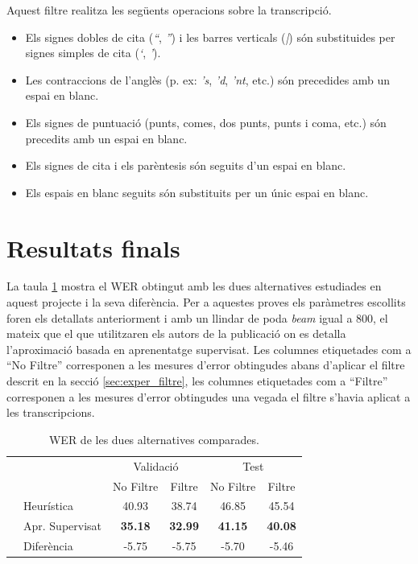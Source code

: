 Aquest filtre realitza les següents operacions sobre la transcripció.
\begin{itemize}
\item Els signes dobles de cita (\emph{``}, \emph{''}) i les barres verticals (\emph{|}) són substituides per signes simples de cita (\emph{`}, \emph{'}).
\item Les contraccions de l'anglès (p. ex: \emph{'s}, \emph{'d}, \emph{'nt}, etc.) són precedides amb un espai en blanc.
\item Els signes de puntuació (punts, comes, dos punts, punts i coma, etc.) són precedits amb un espai en blanc.
\item Els signes de cita i els parèntesis són seguits d'un espai en blanc.
\item Els espais en blanc seguits són substituits per un únic espai en blanc.
\end{itemize}

\section{Resultats finals}
La taula \ref{tab:comp_prhlt_elirf} mostra el WER obtingut amb les dues alternatives estudiades en aquest projecte i la seva diferència. Per a aquestes proves els paràmetres escollits foren els detallats anteriorment i amb un llindar de poda \emph{beam} igual a 800, el mateix que el que utilitzaren els autors de la publicació on es detalla l'aproximació basada en aprenentatge supervisat. Les columnes etiquetades com a ``No Filtre'' corresponen a les mesures d'error obtingudes abans d'aplicar el filtre descrit en la secció \ref{sec:exper_filtre}, les columnes etiquetades com a ``Filtre'' corresponen a les mesures d'error obtingudes una vegada el filtre s'havia aplicat a les transcripcions.\\

\begin{table}
\begin{center}
\begin{tabular}{ll|c|c|c|c|}
\cline{3-6} & & \multicolumn{2}{c|}{Validació} & \multicolumn{2}{c|}{Test}\\
\cline{3-6} & & No Filtre & Filtre & No Filtre & Filtre\\
\cline{1-6} \multicolumn{1}{|l}{} & Heurística & 40.93 & 38.74 & 46.85 & 45.54\\ 
\cline{1-6} \multicolumn{1}{|l}{} & Apr. Supervisat & \textbf{35.18} & \textbf{32.99} & \textbf{41.15} & \textbf{40.08}\\ 
\cline{1-6} \multicolumn{1}{|l}{} & Diferència & -5.75 & -5.75 & -5.70 & -5.46 \\ 
\hline 
\end{tabular} 
\caption{WER de les dues alternatives comparades.}\label{tab:comp_prhlt_elirf}
\end{center}
\end{table}


